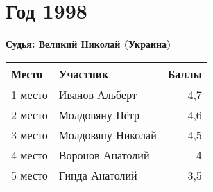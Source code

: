 \chapter{Год 1998}
\textbf{Судья: Великий Николай (Украина)}

\begin{tabularx}{\textwidth}{l l r}
Место & Участник & Баллы \\
\hline
1 место & Иванов Альберт & 4,7 \\
2 место & Молдовяну Пётр & 4,6 \\
3 место & Молдовяну Николай & 4,5 \\
4 место & Воронов Анатолий & 4 \\
5 место & Гинда Анатолий & 3,5 \\
\end{tabularx}